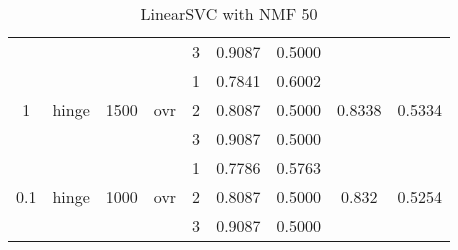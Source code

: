 \documentclass[12pt, twoside]{article}
\begin{document}
\begin{landscape}
\begin{table}[!htbp]
\begin{tabular}{ccccccccc}
  	&	&	&	&	3	&	0.9087	&	0.5000	&		&	 \\
  	\cmidrule(r){5-9}
  	&	&	&	&	1	&	0.7841	&	0.6002	&		&	 \\
  1	&	hinge	&	1500	&	ovr	&	2	&	0.8087	&	0.5000	&	0.8338	&	0.5334 \\
  	&	&	&	&	3	&	0.9087	&	0.5000	&		&	 \\
  	\cmidrule(r){5-9}
  	&	&	&	&	1	&	0.7786	&	0.5763	&		&	 \\
  0.1	&	hinge	&	1000	&	ovr	&	2	&	0.8087	&	0.5000	&	0.832	&	0.5254 \\
  	&	&	&	&	3	&	0.9087	&	0.5000	&		&	 \\
  \bottomrule
  \end{tabular}
  \caption{LinearSVC with NMF 50}
\end{table}
\end{landscape}

\newpage
\end{document}
